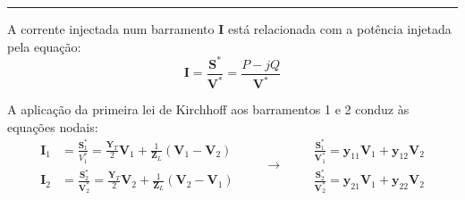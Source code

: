 \vspace{0.5em}\hrule\vspace{0.5em}
\noindent A corrente injectada num barramento \( \mathbf{I} \) está relacionada com a potência injetada pela equação:
$$
    \mathbf{I} = \frac{\mathbf{S}^*}{\mathbf{V}^*} = \frac{P - jQ}{\mathbf{V}^*}
$$

\noindent A aplicação da primeira lei de Kirchhoff aos barramentos 1 e 2 conduz às equações nodais:
$$
    \begin{aligned}
        \mathbf{I}_1 &= \frac{\mathbf{S}_1^*}{V_1^*} = \frac{\mathbf{Y}_T}{2} \mathbf{V}_1 + \frac{1}{\mathbf{Z}_L} (\mathbf{V}_1 - \mathbf{V}_2) \\
        \mathbf{I}_2 &= \frac{\mathbf{S}_2^*}{\mathbf{V}_2^*} = \frac{\mathbf{Y}_T}{2} \mathbf{V}_2 + \frac{1}{\mathbf{Z}_L} (\mathbf{V}_2 - \mathbf{V}_1)      
    \end{aligned}
    \qquad\rightarrow\qquad
    \boxed{\begin{aligned}
        \frac{\mathbf{S}_1^*}{\mathbf{V}_1^*} = \mathbf{y}_{11} \mathbf{V}_1 + \mathbf{y}_{12} \mathbf{V}_2\\
        \frac{\mathbf{S}_2^*}{\mathbf{V}_2^*} = \mathbf{y}_{21} \mathbf{V}_1 + \mathbf{y}_{22} \mathbf{V}_2
    \end{aligned}}
$$

